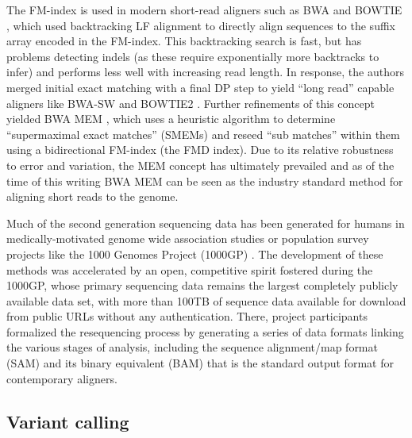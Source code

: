 The FM-index is used in modern short-read aligners such as BWA \cite{li2009fast} and BOWTIE \cite{langmead2009ultrafast}, which used backtracking LF alignment to directly align sequences to the suffix array encoded in the FM-index.
This backtracking search is fast, but has problems detecting indels (as these require exponentially more backtracks to infer) and performs less well with increasing read length.
In response, the authors merged initial exact matching with a final DP step to yield ``long read'' capable aligners like BWA-SW \cite{li2010fast} and BOWTIE2 \cite{langmead2012fast}.
Further refinements of this concept yielded BWA MEM \cite{li2013aligning}, which uses a heuristic algorithm to determine ``supermaximal exact matches'' (SMEMs) and reseed ``sub matches'' within them using a bidirectional FM-index (the FMD index).
Due to its relative robustness to error and variation, the MEM concept has ultimately prevailed and as of the time of this writing BWA MEM can be seen as the industry standard method for aligning short reads to the genome.

Much of the second generation sequencing data has been generated for humans in medically-motivated genome wide association studies \cite{uk10k2015uk10k} or population survey projects like the 1000 Genomes Project (1000GP) \cite{1000Gphase1,1000g2015}. %
The development of these methods was accelerated by an open, competitive spirit fostered during the 1000GP, whose primary sequencing data remains the largest completely publicly available data set, with more than 100TB of sequence data available for download from public URLs without any authentication.
There, project participants formalized the resequencing process by generating a series of data formats linking the various stages of analysis, including the sequence alignment/map format (SAM) and its binary equivalent (BAM) \cite{li2009sequence} that is the standard output format for contemporary aligners.


\subsection{Variant calling}

